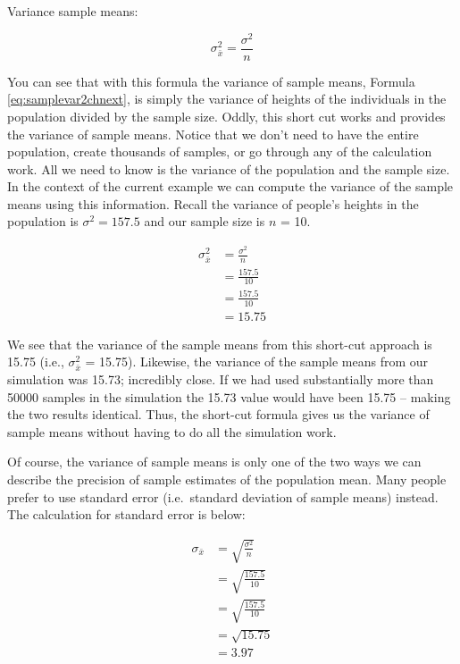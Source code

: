 \documentclass[
]{krantz}
\begin{document}
Variance sample means:

\begin{equation} 
\sigma_{\bar{x}}^2 = \frac{\sigma^2}{n}
      \label{eq:samplevar2chnext}
\end{equation}

You can see that with this formula the variance of sample means, Formula \eqref{eq:samplevar2chnext}, is simply the variance of heights of the individuals in the population divided by the sample size. Oddly, this short cut works and provides the variance of sample means. Notice that we don't need to have the entire population, create thousands of samples, or go through any of the calculation work. All we need to know is the variance of the population and the sample size. In the context of the current example we can compute the variance of the sample means using this information. Recall the variance of people's heights in the population is \(\sigma^2=157.5\) and our sample size is \(n\) = 10.

\[
\begin{aligned} 
\sigma_{\bar{x}}^2 &= \frac{\sigma^2}{n} \\
&= \frac{157.5}{10}\\
&= \frac{157.5}{10}\\
&= 15.75
\end{aligned} 
\]

We see that the variance of the sample means from this short-cut approach is 15.75 (i.e., \(\sigma_{\bar{x}}^2\) = 15.75). Likewise, the variance of the sample means from our simulation was 15.73; incredibly close. If we had used substantially more than 50000 samples in the simulation the 15.73 value would have been 15.75 -- making the two results identical. Thus, the short-cut formula gives us the variance of sample means without having to do all the simulation work.

Of course, the variance of sample means is only one of the two ways we can describe the precision of sample estimates of the population mean. Many people prefer to use standard error (i.e.~standard deviation of sample means) instead. The calculation for standard error is below:

\[
\begin{aligned} 
\sigma_{\bar{x}} &= \sqrt{\frac{\sigma^2}{n}} \\
&= \sqrt{\frac{157.5}{10}}\\
&= \sqrt{\frac{157.5}{10}}\\
&= \sqrt{15.75} \\
&= 3.97 \\
\end{aligned} 
\]
\end{document}
